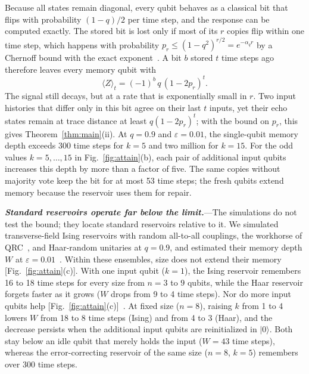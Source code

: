 \documentclass[aps,prl,twocolumn,superscriptaddress,floatfix]{revtex4-2}
\theoremstyle{plain}
\newcommand{\ket}[1]{|#1\rangle}
\newcommand{\runin}[1]{\textit{\textbf{#1}}---}
\begin{document}
Because all states remain diagonal, every qubit behaves as a classical bit that flips with probability $(1-q)/2$ per time step, and the response can be computed exactly. The stored bit is lost only if most of its $r$ copies flip within one time step, which happens with probability $p_r\le(1-q^2)^{r/2}=e^{-\alpha_qr}$ by a Chernoff bound with the exact exponent~\cite{SM}. A bit $b$ stored $t$ time steps ago therefore leaves every memory qubit with
\begin{equation}
\langle Z\rangle_t=(-1)^b\,q\,(1-2p_r)^t .
\label{eq:response}
\end{equation}
The signal still decays, but at a rate that is exponentially small in $r$. Two input histories that differ only in this bit agree on their last $t$ inputs, yet their echo states remain at trace distance at least $q(1-2p_r)^t$; with the bound on $p_r$, this gives Theorem~\ref{thm:main}(ii). At $q=0.9$ and $\varepsilon=0.01$, the single-qubit memory depth exceeds 300 time steps for $k=5$ and two million for $k=15$. For the odd values $k=5,\ldots,15$ in Fig.~\ref{fig:attain}(b), each pair of additional input qubits increases this depth by more than a factor of five. The same copies without majority vote keep the bit for at most 53 time steps; the fresh qubits extend memory because the reservoir uses them for repair.

\runin{Standard reservoirs operate far below the limit.}The simulations do not test the bound; they locate standard reservoirs relative to it. We simulated transverse-field Ising reservoirs with random all-to-all couplings, the workhorse of QRC~\cite{Fujii2017,Nakajima2019,MartinezPena2021}, and Haar-random unitaries at $q=0.9$, and estimated their memory depth $W$ at $\varepsilon=0.01$~\cite{SM}. Within these ensembles, size does not extend their memory [Fig.~\ref{fig:attain}(c)]. With one input qubit ($k=1$), the Ising reservoir remembers 16 to 18 time steps for every size from $n=3$ to $9$ qubits, while the Haar reservoir forgets faster as it grows ($W$ drops from 9 to 4 time steps). Nor do more input qubits help [Fig.~\ref{fig:attain}(c)]~\cite{SM}. At fixed size ($n=8$), raising $k$ from 1 to 4 lowers $W$ from 18 to 8 time steps (Ising) and from 4 to 3 (Haar), and the decrease persists when the additional input qubits are reinitialized in $\ket0$. Both stay below an idle qubit that merely holds the input ($W=43$ time steps), whereas the error-correcting reservoir of the same size ($n=8$, $k=5$) remembers over 300 time steps.
\end{document}
